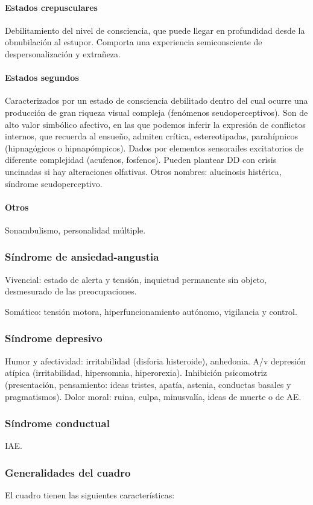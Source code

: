 \paragraph{Estados crepusculares}
Debilitamiento del nivel de consciencia, que puede llegar en profundidad desde la obnubilación al estupor. Comporta una experiencia semiconsciente de despersonalización y extrañeza.
\paragraph{Estados segundos}
Caracterizados por un estado de consciencia debilitado dentro del cual ocurre una producción de gran riqueza visual compleja (fenómenos seudoperceptivos). Son de alto valor simbólico afectivo, en las que podemos inferir la expresión de conflictos internos, que recuerda al ensueño, admiten crítica, estereotipadas, parahípnicos (hipnagógicos o hipnapómpicos). Dados por elementos sensorailes excitatorios de diferente complejidad (acufenos, fosfenos). Pueden plantear DD con crisis uncinadas si hay alteraciones olfativas.
Otros nombres: alucinosis histérica, síndrome seudoperceptivo.
\paragraph{Otros}
Sonambulismo, personalidad múltiple.
\subsubsection*{Síndrome de ansiedad-angustia}
Vivencial: estado de alerta y tensión, inquietud permanente sin objeto, desmesurado de las preocupaciones.

Somático: tensión motora, hiperfuncionamiento autónomo, vigilancia y control.
\subsubsection*{Síndrome depresivo}
Humor y afectividad: irritabilidad (disforia histeroide), anhedonia. A/v depresión atípica (irritabilidad, hipersomnia, hiperorexia). Inhibición psicomotriz (presentación, pensamiento: ideas tristes, apatía, astenia, conductas basales y pragmatismos). Dolor moral: ruina, culpa, minusvalía, ideas de muerte o de AE.
\subsubsection*{Síndrome conductual}
IAE.
\subsubsection*{Generalidades del cuadro}
El cuadro tienen las siguientes características:

